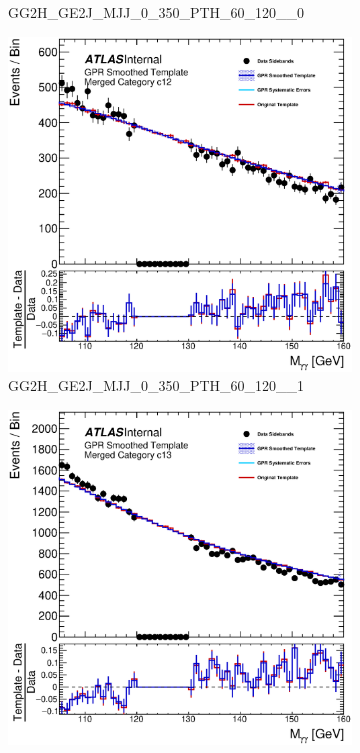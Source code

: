 \begin{figure}
\begin{center}
\begin{subfigure}[T]{0.49\linewidth}
	\caption{GG2H\_GE2J\_MJJ\_0\_350\_PTH\_60\_120\_\_0}
\end{subfigure}
\begin{subfigure}[T]{0.49\linewidth}
	\centering
	\includegraphics[width=\linewidth]{figures/background/gpr/coupCatTemplates/GPR_Smoothed_Plot_hmgg_c12.eps}
	\caption{GG2H\_GE2J\_MJJ\_0\_350\_PTH\_60\_120\_\_1}
\end{subfigure}
\begin{subfigure}[T]{0.49\linewidth}
	\centering
	\includegraphics[width=\linewidth]{figures/background/gpr/coupCatTemplates/GPR_Smoothed_Plot_hmgg_c13.eps}

\end{subfigure}
\end{center}
\end{figure}
